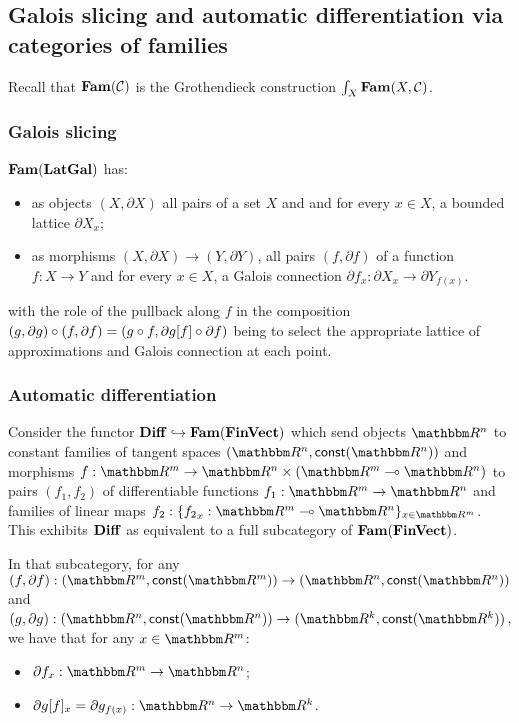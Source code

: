 \subsection{Galois slicing and automatic differentiation via categories of families}
\label{sec:galois-slicing-auto-diff-via-fam}

Recall that $\mathbf{Fam}(\mathcal{C})$ is the Grothendieck construction $\int_{X}\mathbf{Fam}(X, \mathcal{C})$.

\subsubsection{Galois slicing}
\label{sec:galois-slicing-auto-diff-via-fam:galois-slicing}

$\mathbf{Fam}(\mathbf{LatGal})$ has:
\begin{itemize}
\item as objects $(X, \partial X)$ all pairs of a set $X$ and and for every $x \in X$, a bounded lattice
$\partial X_x$;
\item as morphisms $(X, \partial X) \to (Y, \partial Y)$, all pairs $(f, \partial f)$ of a function $f: X \to
Y$ and for every $x \in X$, a Galois connection $\partial f_x: \partial X_x \to \partial Y_{f(x)}$.
\end{itemize}

\noindent with the role of the pullback along $f$ in the composition $(g, \partial g) \circ (f, \partial f) =
(g \circ f, \partial g[f] \circ \partial f)$ being to select the appropriate lattice of
approximations and Galois connection at each point.


\subsubsection{Automatic differentiation}
\label{sec:galois-slicing-auto-diff-via-fam:auto-diff}

Consider the functor $\mathbf{Diff} \hookrightarrow \mathbf{Fam}(\mathbf{FinVect})$ which send objects $\RR^n$ to constant families of
tangent spaces $(\RR^n, \const(\RR^n))$ and morphisms $f: \RR^m \to \RR^n \times (\RR^m \linearto \RR^n)$ to
pairs $(f_1, f_2)$ of differentiable functions $f_1: \RR^m \to \RR^n$ and families of linear maps $f_2:
\{{f_2}_x: \RR^m \linearto \RR^n\}_{x \in \RR^m}$. This exhibits $\mathbf{Diff}$ as equivalent to a full subcategory
of $\mathbf{Fam}(\mathbf{FinVect})$.

In that subcategory, for any $(f, \partial f): (\RR^m, \const(\RR^m)) \to (\RR^n, \const(\RR^n))$ and $(g,
\partial g): (\RR^n, \const(\RR^n)) \to (\RR^k, \const(\RR^k))$, we have that for any $x \in \RR^m$:
\begin{itemize}
\item $\partial f_x: \RR^m \to \RR^n$;
\item $\reindex{\partial g}{f}_x = \partial g_{f(x)}: \RR^n \to \RR^k$.
\end{itemize}

